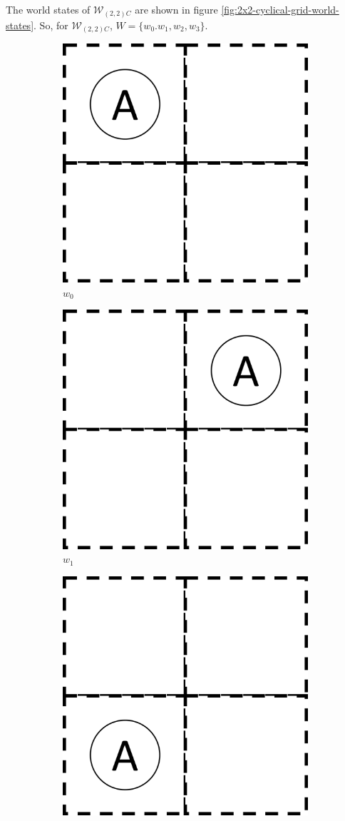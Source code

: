 The world states of $\mathscr{W}_{(2,2)C}$ are shown in figure \ref{fig:2x2-cyclical-grid-world-states}.
So, for $\mathscr{W}_{(2,2)C}$, $W = \{ w_{0}. w_{1}, w_{2}, w_{3} \}$.
\begin{figure}[H]
	\centering
	\begin{subfigure}[b]{0.45\linewidth}
		\centering
		\includegraphics[width=0.5\linewidth]{2MathematicalFramework/InitialFramework/Images/2x2_no_walls_world_states/w0.png}
		\caption{$w_{0}$}
		\vspace{0.25cm}
	\end{subfigure}
	\begin{subfigure}[b]{0.45\linewidth}
		\centering
		\includegraphics[width=0.5\linewidth]{2MathematicalFramework/InitialFramework/Images/2x2_no_walls_world_states/w1.png}
		\caption{$w_{1}$}
		\vspace{0.25cm}
	\end{subfigure}
	\begin{subfigure}[b]{0.45\linewidth}
		\centering
		\includegraphics[width=0.5\linewidth]{2MathematicalFramework/InitialFramework/Images/2x2_no_walls_world_states/w2.png}

\end{subfigure}
\end{figure}
